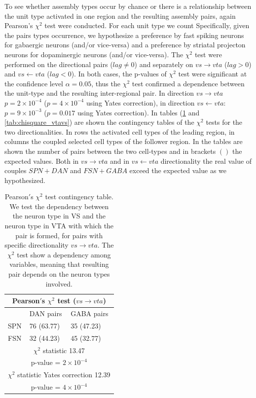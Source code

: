 To see whether assembly types occur by chance or there is a relationship between the unit type activated in one region and the resulting assembly pairs, again Pearson's $\chi^2$ test were conducted. For each unit type we count  Specifically, given the pairs types occurrence, we hypothesize a preference by fast spiking neurons for gabaergic neurons (and/or vice-versa) and a preference by striatal projecton neurons for dopaminergic neurons (and/or vice-versa). The $\chi^2$ test were performed on the directional pairs ($lag\neq0$) and separately on $vs\rightarrow vta$ ($lag>0$) and $vs \leftarrow vta$ ($lag<0$). In both cases, the p-values of $\chi^2$ test were significant at the confidence level $\alpha = 0.05$, thus the $\chi^2$ test confirmed a dependence between the unit-type and the resulting inter-regional pair. In direction $vs\rightarrow vta$ $p=2\times10^{-4}$ ($p=4\times10^{-4}$ using Yates correction), in direction $vs \leftarrow vta$: $p=9\times10^{-3}$ ($p=0.017$ using Yates correction). In tables (\ref{tab:chisquare_vsvta} and \ref{tab:chisquare_vtavs}) are shown the contingency tables of the $\chi^2$ tests for the two directionalities. In rows the activated cell types of the leading region, in columns the coupled selected cell types of the follower region. In the tables are shown the number of pairs between the two cell-types and in brackets $()$ the expected values. Both in $vs\rightarrow vta$ and in $vs\leftarrow vta$ directionality the real value of couples $SPN+DAN$ and $FSN+GABA$ exceed the expected value as we hypothesized. 
\begin{table}[H]
\begin{tabular}{ |p{3cm}|p{3cm}|p{3cm}| }
 \hline
 \multicolumn{3}{|c|}{Pearson$'$s $\chi^2$ test ($vs \rightarrow vta$)} \\
 \hline
 & DAN pairs & GABA pairs\\
 \hline
 SPN & 76 (63.77) & 35 (47.23) \\
 \hline
 FSN & 32 (44.23) & 45 (32.77)\\
 \hline
 \multicolumn{3}{|c|}{$\chi^2$ statistic  13.47}\\
 \multicolumn{3}{|c|}{p-value = $2\times10^{-4}$}\\
 \hline
 \multicolumn{3}{|c|}{$\chi^2$ statistic Yates correction 12.39}\\
 \multicolumn{3}{|c|}{p-value = $4\times10^{-4}$}\\
 \hline
\end{tabular}
\caption{Pearson$'$s $\chi^{2}$ test contingency table. We test the dependency between the neuron type in VS and the neuron type in VTA with which the pair is formed, for pairs with specific directionality $vs \rightarrow vta$. The $\chi^2$ test show a dependency among variables, meaning that resulting pair depends on the neuron types involved.}
\label{tab:chisquare_vsvta}
\end{table}

